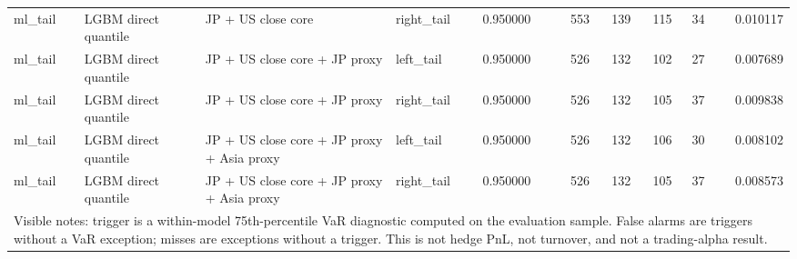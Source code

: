 \begin{tabular}{lllllrrrrr}
ml\_tail & LGBM direct quantile & JP + US close core & right\_tail & 0.950000 & 553 & 139 & 115 & 34 & 0.010117 \\
ml\_tail & LGBM direct quantile & JP + US close core + JP proxy & left\_tail & 0.950000 & 526 & 132 & 102 & 27 & 0.007689 \\
ml\_tail & LGBM direct quantile & JP + US close core + JP proxy & right\_tail & 0.950000 & 526 & 132 & 105 & 37 & 0.009838 \\
ml\_tail & LGBM direct quantile & JP + US close core + JP proxy + Asia proxy & left\_tail & 0.950000 & 526 & 132 & 106 & 30 & 0.008102 \\
ml\_tail & LGBM direct quantile & JP + US close core + JP proxy + Asia proxy & right\_tail & 0.950000 & 526 & 132 & 105 & 37 & 0.008573 \\
\midrule
\multicolumn{10}{l}{\footnotesize Visible notes: trigger is a within-model 75th-percentile VaR diagnostic computed on the evaluation sample. False alarms are triggers without a VaR exception; misses are exceptions without a trigger. This is not hedge PnL, not turnover, and not a trading-alpha result.} \\
\bottomrule
\end{tabular}
